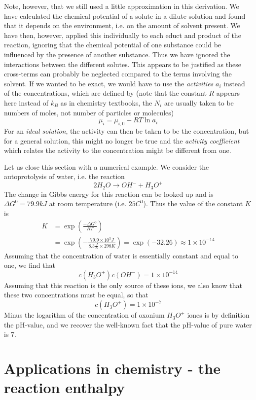 \documentclass[a4paper, draft]{report}
\numberwithin{section}{chapter}
\numberwithin{equation}{chapter}
\theoremstyle{own}
\theoremstyle{remark}
\begin{document}
Note, however, that we still used a little approximation in this derivation. We have calculated the chemical potential of a solute in a dilute solution and found that it depends on the environment, i.e. on the amount of solvent present. We have then, however, applied this individually to each educt and product of the reaction, ignoring that the chemical potential of one substance could be influenced by the presence of another substance. Thus we have ignored the interactions between the different solutes. This appears to be justified as these cross-terms can probably be neglected compared to the terms involving the solvent. If we wanted to be exact, we would have to use the {\em activities} $a_i$ instead of the concentrations, which are defined by (note that the constant $R$ appears here instead of $k_B$ as in chemistry textbooks, the $N_i$ are usually taken to be numbers of moles, not number of particles or molecules)
$$
\mu_i = \mu_{i,0} + RT \ln a_i
$$
For an {\em ideal solution}, the activity can then be taken to be the concentration, but for a general solution, this might no longer be true and the {\em activity coefficient} which relates the activity to the concentration might be different from one.

Let us close this section with a numerical example. We consider the autoprotolysis of water, i.e. the reaction
$$
2 H_2 O \longrightarrow OH^- + H_3 O^+
$$
The change in Gibbs energy for this reaction can be looked up and is $\Delta G^0 = 79.9 kJ$ at room temperature (i.e. $25 C^0$). Thus the value of the constant $K$ is
\begin{align*}
K &= \exp(\frac{-\Delta G^0}{RT} ) \\
&= \exp(-\frac{79.9 \times 10^3 J}{8.3 \frac{J}{K} \times 298 K} ) = \exp(-32.26) \approx 1 \times 10^{-14} 
\end{align*}	
Assuming that the concentration of water is essentially constant and equal to one, we find that
$$
c(H_3O^+) c(OH^-) = 1 \times 10^{-14}
$$
Assuming that this reaction is the only source of these ions, we also know that these two concentrations must be equal, so that
$$
c(H_3O^+)  = 1 \times 10^{-7}
$$
Minus the logarithm of the concentration of oxonium $H_3 O^+$ iones is by definition the pH-value, and we recover the well-known fact that the pH-value of pure water is 7.
	
\section{Applications in chemistry - the reaction enthalpy}
\end{document}
